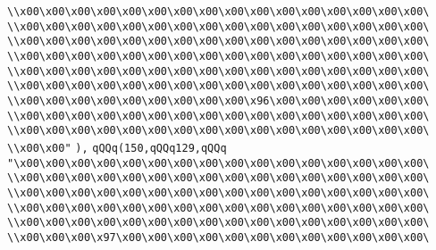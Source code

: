 \verb|\\x00\x00\x00\x00\x00\x00\x00\x00\x00\x00\x00\x00\x00\x00\x00\x00\|\newline
\verb|\\x00\x00\x00\x00\x00\x00\x00\x00\x00\x00\x00\x00\x00\x00\x00\x00\|\newline
\verb|\\x00\x00\x00\x00\x00\x00\x00\x00\x00\x00\x00\x00\x00\x00\x00\x00\|\newline
\verb|\\x00\x00\x00\x00\x00\x00\x00\x00\x00\x00\x00\x00\x00\x00\x00\x00\|\newline
\verb|\\x00\x00\x00\x00\x00\x00\x00\x00\x00\x00\x00\x00\x00\x00\x00\x00\|\newline
\verb|\\x00\x00\x00\x00\x00\x00\x00\x00\x00\x00\x00\x00\x00\x00\x00\x00\|\newline
\verb|\\x00\x00\x00\x00\x00\x00\x00\x00\x00\x96\x00\x00\x00\x00\x00\x00\|\newline
\verb|\\x00\x00\x00\x00\x00\x00\x00\x00\x00\x00\x00\x00\x00\x00\x00\x00\|\newline
\verb|\\x00\x00\x00\x00\x00\x00\x00\x00\x00\x00\x00\x00\x00\x00\x00\x00\|\newline
\verb|\\x00\x00"|\newline
\verb|),|\newline
\verb|qQQq(150,qQQq129,qQQq|\newline
\verb|"\x00\x00\x00\x00\x00\x00\x00\x00\x00\x00\x00\x00\x00\x00\x00\x00\|\newline
\verb|\\x00\x00\x00\x00\x00\x00\x00\x00\x00\x00\x00\x00\x00\x00\x00\x00\|\newline
\verb|\\x00\x00\x00\x00\x00\x00\x00\x00\x00\x00\x00\x00\x00\x00\x00\x00\|\newline
\verb|\\x00\x00\x00\x00\x00\x00\x00\x00\x00\x00\x00\x00\x00\x00\x00\x00\|\newline
\verb|\\x00\x00\x00\x00\x00\x00\x00\x00\x00\x00\x00\x00\x00\x00\x00\x00\|\newline
\verb|\\x00\x00\x00\x97\x00\x00\x00\x00\x00\x00\x00\x00\x00\x00\x00\x00\|\newline
